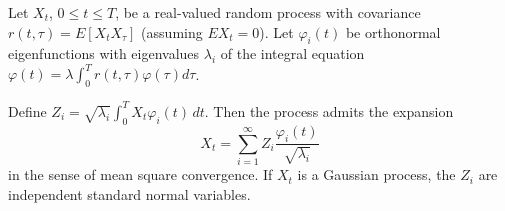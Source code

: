 Let $X_t$, $0 \leq t \leq T$, be a real-valued random process with covariance $r(t,\tau) = E[X_t X_\tau]$ (assuming $E X_t = 0$). Let $\varphi_i(t)$ be orthonormal eigenfunctions with eigenvalues $\lambda_i$ of the integral equation $\varphi(t) = \lambda \int_0^T r(t,\tau) \varphi(\tau) d\tau$.

Define $Z_i = \sqrt{\lambda_i} \int_0^T X_t \varphi_i(t) \, dt$. Then the process admits the expansion
$$X_t = \sum_{i=1}^{\infty} Z_i \frac{\varphi_i(t)}{\sqrt{\lambda_i}}$$
in the sense of mean square convergence. If $X_t$ is a Gaussian process, the $Z_i$ are independent standard normal variables.
